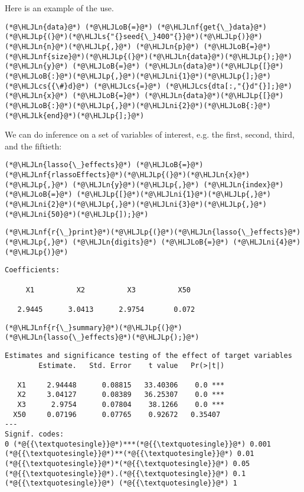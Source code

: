 \documentclass[12pt,a4paper]{article}
\newcommand{\HLJLk}[1]{\textcolor[RGB]{148,91,176}{\textbf{#1}}}
\newcommand{\HLJLn}[1]{#1}
\newcommand{\HLJLnf}[1]{\textcolor[RGB]{66,102,213}{#1}}
\newcommand{\HLJLs}[1]{\textcolor[RGB]{201,61,57}{#1}}
\newcommand{\HLJLni}[1]{\textcolor[RGB]{59,151,46}{#1}}
\newcommand{\HLJLoB}[1]{\textcolor[RGB]{102,102,102}{\textbf{#1}}}
\newcommand{\HLJLp}[1]{#1}
\newcommand{\HLJLcs}[1]{\textcolor[RGB]{153,153,119}{\textit{#1}}}
\begin{document}
Here is an example of the use.


\begin{lstlisting}
(*@\HLJLn{data}@*) (*@\HLJLoB{=}@*) (*@\HLJLnf{get{\_}data}@*)(*@\HLJLp{(}@*)(*@\HLJLs{"{}seed{\_}400"{}}@*)(*@\HLJLp{)}@*)
(*@\HLJLn{n}@*)(*@\HLJLp{,}@*) (*@\HLJLn{p}@*) (*@\HLJLoB{=}@*) (*@\HLJLnf{size}@*)(*@\HLJLp{(}@*)(*@\HLJLn{data}@*)(*@\HLJLp{);}@*)
(*@\HLJLn{y}@*) (*@\HLJLoB{=}@*) (*@\HLJLn{data}@*)(*@\HLJLp{[}@*)(*@\HLJLoB{:}@*)(*@\HLJLp{,}@*)(*@\HLJLni{1}@*)(*@\HLJLp{];}@*)
(*@\HLJLcs{{\#}d}@*) (*@\HLJLcs{=}@*) (*@\HLJLcs{dta[:,"{}d"{}];}@*)
(*@\HLJLn{x}@*) (*@\HLJLoB{=}@*) (*@\HLJLn{data}@*)(*@\HLJLp{[}@*)(*@\HLJLoB{:}@*)(*@\HLJLp{,}@*)(*@\HLJLni{2}@*)(*@\HLJLoB{:}@*)(*@\HLJLk{end}@*)(*@\HLJLp{];}@*)
\end{lstlisting}


We can do inference on a set of variables of interest, e.g. the first, second, third, and the fiftieth:


\begin{lstlisting}
(*@\HLJLn{lasso{\_}effects}@*) (*@\HLJLoB{=}@*) (*@\HLJLnf{rlassoEffects}@*)(*@\HLJLp{(}@*)(*@\HLJLn{x}@*)(*@\HLJLp{,}@*) (*@\HLJLn{y}@*)(*@\HLJLp{,}@*) (*@\HLJLn{index}@*) (*@\HLJLoB{=}@*) (*@\HLJLp{[}@*)(*@\HLJLni{1}@*)(*@\HLJLp{,}@*)(*@\HLJLni{2}@*)(*@\HLJLp{,}@*)(*@\HLJLni{3}@*)(*@\HLJLp{,}@*)(*@\HLJLni{50}@*)(*@\HLJLp{]);}@*)
\end{lstlisting}


\begin{lstlisting}
(*@\HLJLnf{r{\_}print}@*)(*@\HLJLp{(}@*)(*@\HLJLn{lasso{\_}effects}@*)(*@\HLJLp{,}@*) (*@\HLJLn{digits}@*) (*@\HLJLoB{=}@*) (*@\HLJLni{4}@*)(*@\HLJLp{)}@*)
\end{lstlisting}

\begin{lstlisting}
Coefficients:

     X1          X2          X3          X50

   2.9445      3.0413      2.9754       0.072
\end{lstlisting}


\begin{lstlisting}
(*@\HLJLnf{r{\_}summary}@*)(*@\HLJLp{(}@*)(*@\HLJLn{lasso{\_}effects}@*)(*@\HLJLp{);}@*)
\end{lstlisting}

\begin{lstlisting}
Estimates and significance testing of the effect of target variables
        Estimate.   Std. Error    t value   Pr(>|t|)

   X1     2.94448      0.08815   33.40306    0.0 ***
   X2     3.04127      0.08389   36.25307    0.0 ***
   X3      2.9754      0.07804    38.1266    0.0 ***
  X50     0.07196      0.07765    0.92672   0.35407
---
Signif. codes:
0 (*@{{\textquotesingle}}@*)***(*@{{\textquotesingle}}@*) 0.001 (*@{{\textquotesingle}}@*)**(*@{{\textquotesingle}}@*) 0.01 (*@{{\textquotesingle}}@*)*(*@{{\textquotesingle}}@*) 0.05 (*@{{\textquotesingle}}@*).(*@{{\textquotesingle}}@*) 0.1 (*@{{\textquotesingle}}@*) (*@{{\textquotesingle}}@*) 1
\end{lstlisting}
\end{document}
